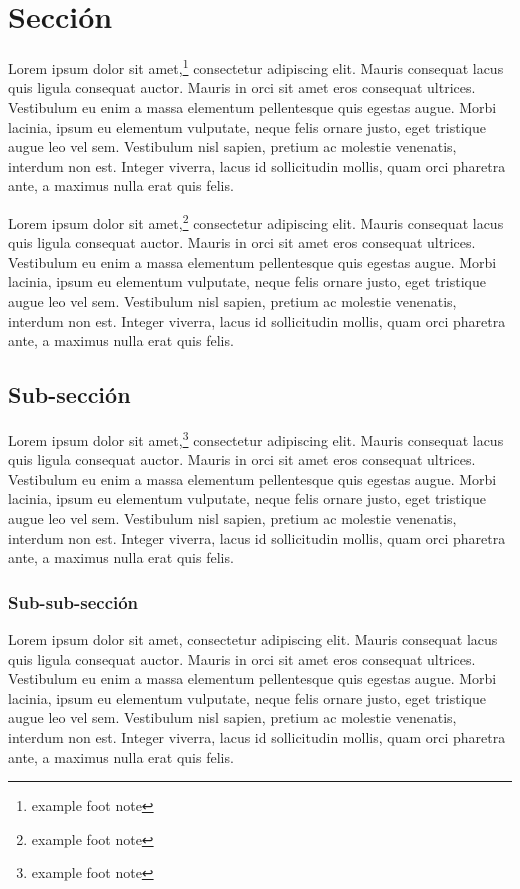 \documentclass[letterpaper]{pt-article}
\begin{document}
\section{Sección}
Lorem ipsum dolor sit amet,\footnote{example foot note} consectetur adipiscing elit. Mauris consequat lacus quis ligula consequat auctor. Mauris in orci sit amet eros consequat ultrices. Vestibulum eu enim a massa elementum pellentesque quis egestas augue. Morbi lacinia, ipsum eu elementum vulputate, neque felis ornare justo, eget tristique augue leo vel sem. Vestibulum nisl sapien, pretium ac molestie venenatis, interdum non est. Integer viverra, lacus id sollicitudin mollis, quam orci pharetra ante, a maximus nulla erat quis felis.

Lorem ipsum dolor sit amet,\footnote{example foot note} consectetur adipiscing elit. Mauris consequat lacus quis ligula consequat auctor. Mauris in orci sit amet eros consequat ultrices. Vestibulum eu enim a massa elementum pellentesque quis egestas augue. Morbi lacinia, ipsum eu elementum vulputate, neque felis ornare justo, eget tristique augue leo vel sem. Vestibulum nisl sapien, pretium ac molestie venenatis, interdum non est. Integer viverra, lacus id sollicitudin mollis, quam orci pharetra ante, a maximus nulla erat quis felis.

\subsection{Sub-sección}
Lorem ipsum dolor sit amet,\footnote{example foot note} consectetur adipiscing elit. Mauris consequat lacus quis ligula consequat auctor. Mauris in orci sit amet eros consequat ultrices. Vestibulum eu enim a massa elementum pellentesque quis egestas augue. Morbi lacinia, ipsum eu elementum vulputate, neque felis ornare justo, eget tristique augue leo vel sem. Vestibulum nisl sapien, pretium ac molestie venenatis, interdum non est. Integer viverra, lacus id sollicitudin mollis, quam orci pharetra ante, a maximus nulla erat quis felis.

\subsubsection{Sub-sub-sección}
Lorem ipsum dolor sit amet, consectetur adipiscing elit. Mauris consequat lacus quis ligula consequat auctor. Mauris in orci sit amet eros consequat ultrices. Vestibulum eu enim a massa elementum pellentesque quis egestas augue. Morbi lacinia, ipsum eu elementum vulputate, neque felis ornare justo, eget tristique augue leo vel sem. Vestibulum nisl sapien, pretium ac molestie venenatis, interdum non est. Integer viverra, lacus id sollicitudin mollis, quam orci pharetra ante, a maximus nulla erat quis felis.
\end{document}
